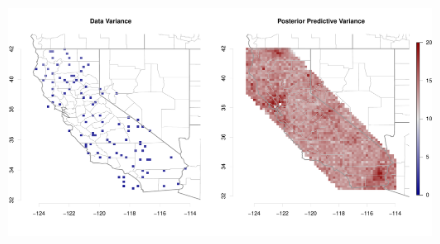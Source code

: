 \documentclass[11pt]{article}
\def\beginmyfig{\begin{figure}[h]\center}
\def\endmyfig{\end{figure}}
\begin{document}
\beginmyfig
  \includegraphics[scale=.5]{../graphs/postpredvar.pdf}
  \caption{}
  \label{fig:datmean}
\endmyfig

\end{document}
